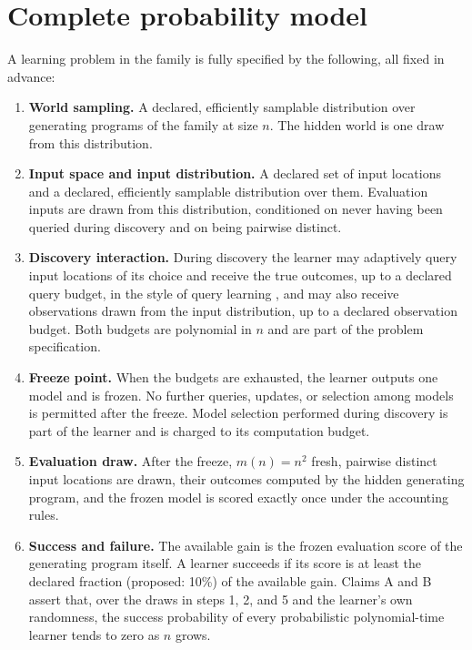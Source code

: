 \documentclass[11pt]{article}
\begin{document}
\section{Complete probability model}

A learning problem in the family is fully specified by the following, all fixed in advance:

\begin{enumerate}
\item \textbf{World sampling.} A declared, efficiently samplable distribution over generating programs of the family at size $n$. The hidden world is one draw from this distribution.
\item \textbf{Input space and input distribution.} A declared set of input locations and a declared, efficiently samplable distribution over them. Evaluation inputs are drawn from this distribution, conditioned on never having been queried during discovery and on being pairwise distinct.
\item \textbf{Discovery interaction.} During discovery the learner may adaptively query input locations of its choice and receive the true outcomes, up to a declared query budget, in the style of query learning \cite{angluin1988, valiant1984}, and may also receive observations drawn from the input distribution, up to a declared observation budget. Both budgets are polynomial in $n$ and are part of the problem specification.
\item \textbf{Freeze point.} When the budgets are exhausted, the learner outputs one model and is frozen. No further queries, updates, or selection among models is permitted after the freeze. Model selection performed during discovery is part of the learner and is charged to its computation budget.
\item \textbf{Evaluation draw.} After the freeze, $m(n) = n^2$ fresh, pairwise distinct input locations are drawn, their outcomes computed by the hidden generating program, and the frozen model is scored exactly once under the accounting rules.
\item \textbf{Success and failure.} The available gain is the frozen evaluation score of the generating program itself. A learner succeeds if its score is at least the declared fraction (proposed: 10\%) of the available gain. Claims A and B assert that, over the draws in steps 1, 2, and 5 and the learner's own randomness, the success probability of every probabilistic polynomial-time learner tends to zero as $n$ grows.
\end{enumerate}
\end{document}
